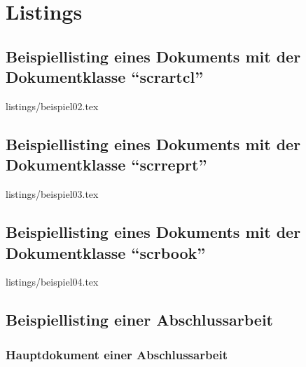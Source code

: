 %
%

\chapter{Listings}

\section{Beispiellisting eines Dokuments mit der Dokumentklasse \enquote{scrartcl}}
\label{sec:lstarticle}

%
	{listings/beispiel02.tex}
	
\section{Beispiellisting eines Dokuments mit der Dokumentklasse \enquote{scrreprt}}
\label{sec:lstreport}

%
	{listings/beispiel03.tex}
	
\section{Beispiellisting eines Dokuments mit der Dokumentklasse \enquote{scrbook}}
\label{sec:lstbook}

%
	{listings/beispiel04.tex}

\newpage	
\section{Beispiellisting einer Abschlussarbeit}
\label{sec:listing_abschlussarbeit}

\subsection{Hauptdokument einer Abschlussarbeit}
\label{subsec:listing_hauptdokument}

